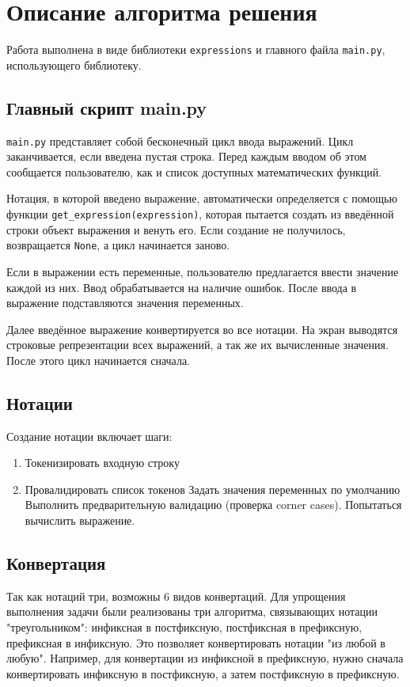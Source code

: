 \section*{Описание алгоритма решения}

Работа выполнена в виде библиотеки \verb|expressions|
и главного файла \verb|main.py|, использующего
библиотеку.

\subsection*{Главный скрипт main.py}

\verb|main.py| представляет собой бесконечный цикл
ввода выражений.
Цикл заканчивается, если введена пустая строка.
Перед каждым вводом об этом сообщается пользователю,
как и список доступных математических функций.

Нотация, в которой введено выражение, автоматически определяется
с помощью функции \verb|get_expression(expression)|,
которая пытается создать из введённой строки объект выражения и венуть его.
Если создание не получилось, возвращается \verb|None|,
а цикл начинается заново.

Если в выражении есть переменные,
пользователю предлагается ввести значение каждой из них.
Ввод обрабатывается на наличие ошибок.
После ввода в выражение подставляются значения переменных.

Далее введённое выражение конвертируется во все нотации.
На экран выводятся строковые репрезентации всех выражений,
а так же их вычисленные значения.
После этого цикл начинается сначала.

\subsection*{Нотации}

Создание нотации включает шаги:

\begin{enumerate}
    \item Токенизировать входную строку
    \item Провалидировать список токенов
        \subitem Задать значения переменных по умолчанию
        \subitem Выполнить предварительную валидацию (проверка corner cases).
        \subitem Попытаться вычислить выражение.
\end{enumerate}

\subsection*{Конвертация}

Так как нотаций три, возможны 6 видов конвертаций.
Для упрощения выполнения задачи были реализованы три алгоритма,
связывающих нотации "треугольником":
инфиксная в постфиксную,
постфиксная в префиксную,
префиксная в инфиксную.
Это позволяет конвертировать нотации "из любой в любую".
Например, для конвертации из инфиксной в префиксную,
нужно сначала конвертировать инфиксную в постфиксную,
а затем постфиксную в префиксную.